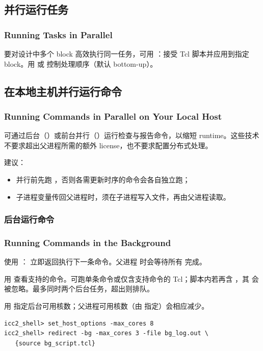 \subsection{并行运行任务}
\subsubsection*{Running Tasks in Parallel}

要对设计中多个 block 高效执行同一任务，可用 ：接受 Tcl 脚本并应用到指定 block。用  或  控制处理顺序（默认 bottom-up）。

\subsection{在本地主机并行运行命令}
\subsubsection*{Running Commands in Parallel on Your Local Host}

可通过后台（）或前台并行（）运行检查与报告命令，以缩短 runtime。这些技术不要求超出父进程所需的额外 license，也不要求配置分布式处理。

建议：
\begin{itemize}
  \item 并行前先跑 ，否则各需更新时序的命令会各自独立跑；
  \item 子进程变量传回父进程时，须在子进程写入文件，再由父进程读取。
\end{itemize}

\subsubsection{后台运行命令}
\subsubsection*{Running Commands in the Background}

使用 ： 立即返回执行下一条命令。父进程  时会等待所有  完成。

用  查看支持的命令。可跑单条命令或仅含支持命令的 Tcl；脚本内若再含 ，其  会被忽略。最多同时两个后台任务，超出则排队。

用  指定后台可用核数；父进程可用核数（由  指定）会相应减少。
\begin{lstlisting}
icc2_shell> set_host_options -max_cores 8
icc2_shell> redirect -bg -max_cores 3 -file bg_log.out \
   {source bg_script.tcl}
\end{lstlisting}


